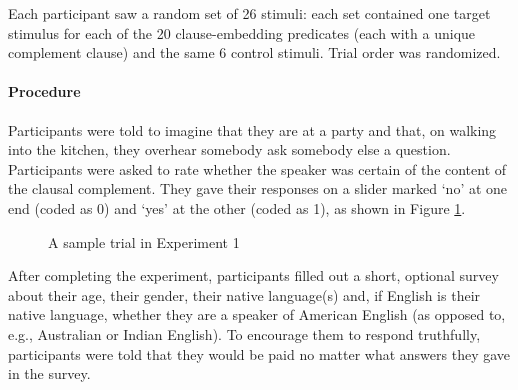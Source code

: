 \documentclass[11pt,fleqn]{article}
\newcommand{\6}{\mbox{$[\hspace*{-.6mm}[$}}
\newcommand{\9}{\mbox{$]\hspace*{-.6mm}]$}}
\begin{document}
Each participant saw a random set of 26 stimuli: each set contained one target stimulus for each of the 20 clause-embedding predicates (each with a unique complement clause) and the same 6 control stimuli. Trial order was randomized.

\paragraph{Procedure} Participants were told to imagine that they are at a party and that, on walking into the kitchen, they overhear somebody ask somebody else a question. Participants were asked to rate whether the speaker was certain of the content of the clausal complement. They gave their responses on a slider marked `no' at one end (coded as 0) and `yes' at the other (coded as 1), as shown in Figure \ref{fig-trial-exp1}.

\begin{figure}[h!]
\begin{center}
\end{center}
\caption{A sample trial in Experiment 1}\label{fig-trial-exp1}
\end{figure}

After completing the experiment, participants filled out a short, optional survey about their age, their gender, their native language(s) and, if English is their native language, whether they are a speaker of American English (as opposed to, e.g., Australian or Indian English). To encourage them to respond truthfully, participants were told that they would be paid no matter what answers they gave in the survey.
\end{document}
